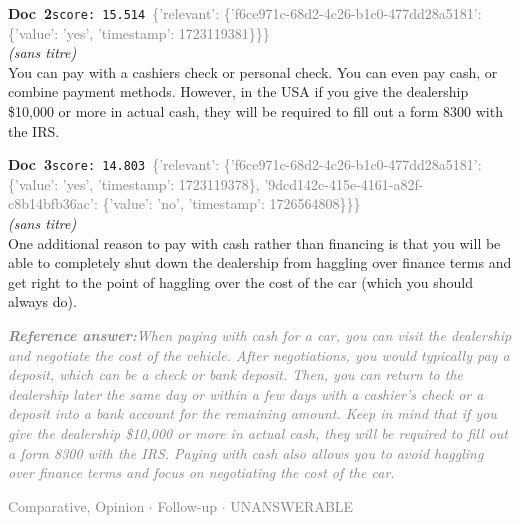 \documentclass[a4paper,11pt]{article}
\begin{document}
\begin{docenv}
{\footnotesize\textcolor{doccolor}{\textbf{Doc~2}}}\hfill{\tiny\texttt{score:~15.514}}\ {\tiny\textcolor{gray}{\{'relevant': \{'f6ce971c-68d2-4c26-b1c0-477dd28a5181': \{'value': 'yes', 'timestamp': 1723119381\}\}\}}}\\[3pt]
{\small\textit{(sans titre)}}\\[2pt]
\vspace{2pt}
{\footnotesize 
You can pay with a cashiers check or personal check. You can even pay cash, or combine payment methods. However, in the USA if you give the dealership \$10,000 or more in actual cash, they will be required to fill out a form 8300 with the IRS.}
\end{docenv}
\begin{docenv}
{\footnotesize\textcolor{doccolor}{\textbf{Doc~3}}}\hfill{\tiny\texttt{score:~14.803}}\ {\tiny\textcolor{gray}{\{'relevant': \{'f6ce971c-68d2-4c26-b1c0-477dd28a5181': \{'value': 'yes', 'timestamp': 1723119378\}, '9dcd142c-415e-4161-a82f-c8b14bfb36ac': \{'value': 'no', 'timestamp': 1726564808\}\}\}}}\\[3pt]
{\small\textit{(sans titre)}}\\[2pt]
\vspace{2pt}
{\footnotesize 
One additional reason to pay with cash rather than financing is that you will be able to completely shut down the dealership from haggling over finance terms and get right to the point of haggling over the cost of the car (which you should always do).}
\end{docenv}
\begin{refanswerenv}
{\footnotesize\textit{\textcolor{gray}{\textbf{Reference answer:}\enspace When paying with cash for a car, you can visit the dealership and negotiate the cost of the vehicle. After negotiations, you would typically pay a deposit, which can be a check or bank deposit. Then, you can return to the dealership later the same day or within a few days with a cashier's check or a deposit into a bank account for the remaining amount. Keep in mind that if you give the dealership \$10,000 or more in actual cash, they will be required to fill out a form 8300 with the IRS. Paying with cash also allows you to avoid haggling over finance terms and focus on negotiating the cost of the car.}}}
\end{refanswerenv}
\vspace{0.5em}
\hfill{\tiny\textcolor{gray}{Comparative, Opinion $\cdot$ Follow-up $\cdot$ UNANSWERABLE}}
\end{document}
